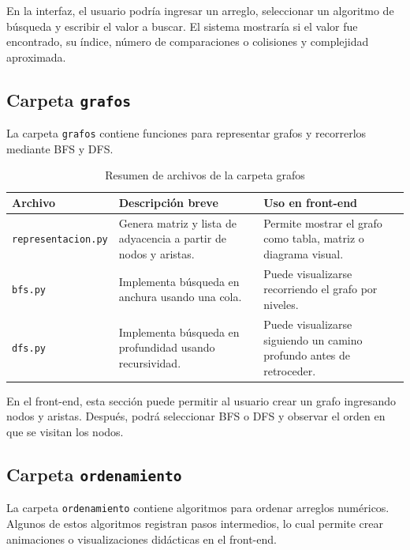 \documentclass[12pt]{article}
\begin{document}
	En la interfaz, el usuario podría ingresar un arreglo, seleccionar un algoritmo de búsqueda y escribir el valor a buscar. El sistema mostraría si el valor fue encontrado, su índice, número de comparaciones o colisiones y complejidad aproximada.
	
	\subsection{Carpeta \texttt{grafos}}
	
	La carpeta \texttt{grafos} contiene funciones para representar grafos y recorrerlos mediante BFS y DFS.
	
	\begin{table}[H]
		\centering
		\begin{tabular}{|p{4cm}|p{5cm}|p{5cm}|}
			\hline
			\textbf{Archivo} & \textbf{Descripción breve} & \textbf{Uso en front-end} \\
			\hline
			\texttt{representacion.py} & Genera matriz y lista de adyacencia a partir de nodos y aristas. & Permite mostrar el grafo como tabla, matriz o diagrama visual. \\
			\hline
			\texttt{bfs.py} & Implementa búsqueda en anchura usando una cola. & Puede visualizarse recorriendo el grafo por niveles. \\
			\hline
			\texttt{dfs.py} & Implementa búsqueda en profundidad usando recursividad. & Puede visualizarse siguiendo un camino profundo antes de retroceder. \\
			\hline
		\end{tabular}
		\caption{Resumen de archivos de la carpeta grafos}
	\end{table}
	
	En el front-end, esta sección puede permitir al usuario crear un grafo ingresando nodos y aristas. Después, podrá seleccionar BFS o DFS y observar el orden en que se visitan los nodos.
	
\subsection{Carpeta \texttt{ordenamiento}}

La carpeta \texttt{ordenamiento} contiene algoritmos para ordenar arreglos numéricos. Algunos de estos algoritmos registran pasos intermedios, lo cual permite crear animaciones o visualizaciones didácticas en el front-end.
\end{document}
